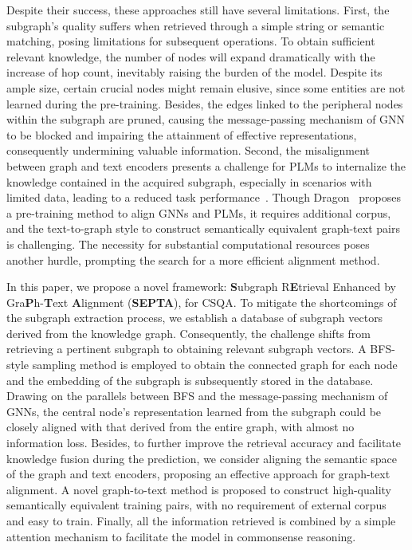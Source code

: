 \documentclass[runningheads]{llncs}
\begin{document}
Despite their success, these approaches still have several limitations. First, the subgraph's quality suffers when retrieved through a simple string or semantic matching, posing limitations for subsequent operations. To obtain sufficient relevant knowledge, the number of nodes will expand dramatically with the increase of hop count, inevitably raising the burden of the model. Despite its ample size, certain crucial nodes might remain elusive, since some entities are not learned during the pre-training. Besides, the edges linked to the peripheral nodes within the subgraph are pruned, causing the message-passing mechanism of GNN to be blocked and impairing the attainment of effective representations, consequently undermining valuable information. Second, the misalignment between graph and text encoders presents a challenge for PLMs to internalize the knowledge contained in the acquired subgraph, especially in scenarios with limited data, leading to a reduced task performance~\cite{ref:fits}. Though Dragon~\cite{ref:dragon} proposes a pre-training method to align GNNs and PLMs, it requires additional corpus, and the text-to-graph style to construct semantically equivalent graph-text pairs is challenging. The necessity for substantial computational resources poses another hurdle, prompting the search for a more efficient alignment method.

In this paper, we propose a novel framework: \textbf{S}ubgraph R\textbf{E}trieval Enhanced by Gra\textbf{P}h-\textbf{T}ext \textbf{A}lignment (\textbf{SEPTA}), for CSQA. To mitigate the shortcomings of the subgraph extraction process, we establish a database of subgraph vectors derived from the knowledge graph. Consequently, the challenge shifts from retrieving a pertinent subgraph to obtaining relevant subgraph vectors. A BFS-style sampling method is employed to obtain the connected graph for each node and the embedding of the subgraph is subsequently stored in the database. Drawing on the parallels between BFS and the message-passing mechanism of GNNs, the central node's representation learned from the subgraph could be closely aligned with that derived from the entire graph, with almost no information loss. Besides, to further improve the retrieval accuracy and facilitate knowledge fusion during the prediction, we consider aligning the semantic space of the graph and text encoders, proposing an effective approach for graph-text alignment. A novel graph-to-text method is proposed to construct high-quality semantically equivalent training pairs, with no requirement of external corpus and easy to train. Finally, all the information retrieved is combined by a simple attention mechanism to facilitate the model in commonsense reasoning.
\end{document}
